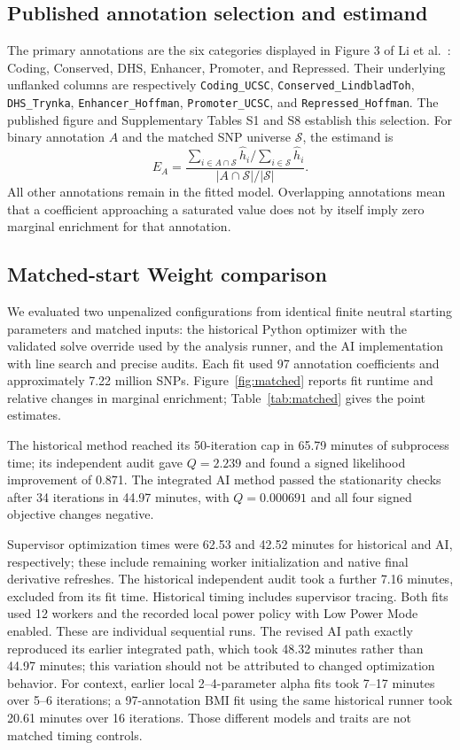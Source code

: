 \documentclass[11pt]{article}
\begin{document}
\subsection{Published annotation selection and estimand}
The primary annotations are the six categories displayed in Figure 3 of Li et al.\ \cite{li}: Coding, Conserved, DHS, Enhancer, Promoter, and Repressed. Their underlying unflanked columns are respectively \texttt{Coding\_UCSC}, \texttt{Conserved\_LindbladToh}, \texttt{DHS\_Trynka}, \texttt{Enhancer\_Hoffman}, \texttt{Promoter\_UCSC}, and \texttt{Repressed\_Hoffman}. The published figure and Supplementary Tables S1 and S8 establish this selection. For binary annotation $A$ and the matched SNP universe $\mathcal S$, the estimand is
\begin{equation}
 E_A=\frac{\sum_{i\in A\cap\mathcal S}\widehat h_i/\sum_{i\in\mathcal S}\widehat h_i}
 {|A\cap\mathcal S|/|\mathcal S|}.
\end{equation}
All other annotations remain in the fitted model. Overlapping annotations mean that a coefficient approaching a saturated value does not by itself imply zero marginal enrichment for that annotation.

\subsection{Matched-start Weight comparison}
We evaluated two unpenalized configurations from identical finite neutral starting parameters and matched inputs: the historical Python optimizer with the validated solve override used by the analysis runner, and the AI implementation with line search and precise audits. Each fit used 97 annotation coefficients and approximately 7.22 million SNPs. Figure~\ref{fig:matched} reports fit runtime and relative changes in marginal enrichment; Table~\ref{tab:matched} gives the point estimates.

The historical method reached its 50-iteration cap in 65.79 minutes of subprocess time; its independent audit gave $Q=2.239$ and found a signed likelihood improvement of 0.871. The integrated AI method passed the stationarity checks after 34 iterations in 44.97 minutes, with $Q=0.000691$ and all four signed objective changes negative.

Supervisor optimization times were 62.53 and 42.52 minutes for historical and AI, respectively; these include remaining worker initialization and native final derivative refreshes. The historical independent audit took a further 7.16 minutes, excluded from its fit time. Historical timing includes supervisor tracing. Both fits used 12 workers and the recorded local power policy with Low Power Mode enabled. These are individual sequential runs. The revised AI path exactly reproduced its earlier integrated path, which took 48.32 minutes rather than 44.97 minutes; this variation should not be attributed to changed optimization behavior. For context, earlier local 2--4-parameter alpha fits took 7--17 minutes over 5--6 iterations; a 97-annotation BMI fit using the same historical runner took 20.61 minutes over 16 iterations. Those different models and traits are not matched timing controls.
\end{document}
